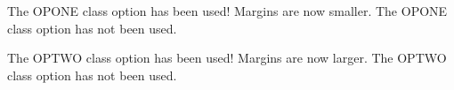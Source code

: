 \documentclass[OPONE]{example}
\begin{document}

{The OPONE class option has been used! Margins are now smaller.}
{The OPONE class option has not been used.}

{The OPTWO class option has been used! Margins are now larger.}
{The OPTWO class option has not been used.}

\end{document}
